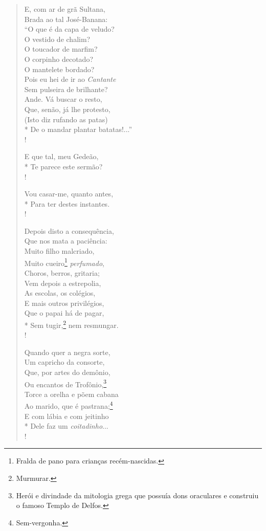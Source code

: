 \begin{verse}
E, com ar de grã Sultana,\\
Brada ao tal José-Banana:\\
``O que é da capa de veludo?\\
O vestido de chalim?\\
O toucador de marfim?\\
O corpinho decotado?\\
O mantelete bordado?\\
Pois eu hei de ir ao \emph{Cantante}\\
Sem pulseira de brilhante?\\
Ande. Vá buscar o resto,\\
Que, senão, já lhe protesto,\\
(Isto diz rufando as patas)\\*
De o mandar plantar batatas!...''\\!

E que tal, meu Gedeão,\\*
Te parece este sermão?\\!

Vou casar-me, quanto antes,\\*
Para ter destes instantes.\\!

Depois disto a consequência,\\
Que nos mata a paciência:\\
Muito filho malcriado,\\
Muito cueiro\footnote{ Fralda de pano para crianças recém-nascidas.} \emph{perfumado},\\
Choros, berros, gritaria;\\
Vem depois a estrepolia,\\
As escolas, os colégios,\\
E mais outros privilégios,\\
Que o papai há de pagar,\\*
Sem tugir,\footnote{ Murmurar.} nem resmungar.\\!

Quando quer a negra sorte,\\
Um capricho da consorte,\\
Que, por artes do demônio,\\
Ou encantos de Trofônio,\footnote{ Herói e divindade da mitologia
                      grega que possuía dons oraculares e construiu o famoso Templo de
                      Delfos.}\\
Torce a orelha e põem cabana\\
Ao marido, que é pastrana;\footnote{ Sem-vergonha.}\\
E com lábia e com jeitinho\\*
Dele faz um \emph{coitadinho}...\\!


\end{verse}
